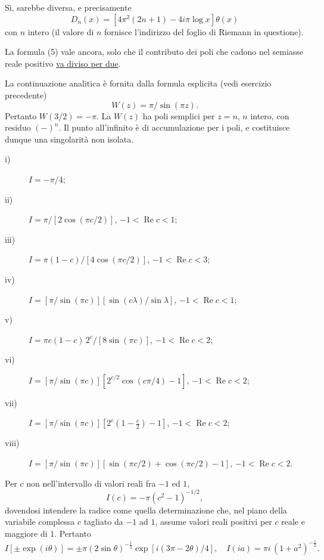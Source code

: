\documentclass[11pt, a4paper]{book}
\numberwithin{equation}{section}
\begin{document}
\begin{description}
Sì, sarebbe diversa, e precisamente
$$D_n(x) = \left[4\pi^2(2n+1) - 4i\pi\log x\right]\theta(x)$$
con $n$ intero (il valore di $n$ fornisce l'indirizzo del foglio di Riemann in questione).

\item[10-1] La formula (5) vale ancora, solo che il contributo dei poli che cadono nel semiasse reale positivo \uline{va diviso per due}.

\item[10-3] La continuazione analitica è fornita dalla formula esplicita (vedi esercizio precedente)
$$W(z) = \pi/\sin(\pi z).$$
Pertanto $W(3/2) = -\pi$. La $W(z)$ ha poli semplici per $z = n$, $n$ intero, con residuo $(-)^n$. Il punto all'infinito è di accumulazione per i poli, e costituisce dunque una singolarità non isolata.

\item[10-5] 
\begin{description}
\item[i)] $I = -\pi/4$;
\item[ii)] $I = \pi/\left[2\cos(\pi c/2)\right]$, \quad $-1 < \operatorname{Re} c < 1$;
\item[iii)] $I = \pi(1-c)/\left[4\cos(\pi c/2)\right]$, \quad $-1 < \operatorname{Re} c < 3$;
\item[iv)] $I = \left[\pi/\sin(\pi c)\right]\left[\sin(c\lambda)/\sin\lambda\right]$, \quad $-1 < \operatorname{Re} c < 1$;
\item[v)] $I = \pi c(1-c)\,2^c/\left[8\sin(\pi c)\right]$, \quad $-1 < \operatorname{Re} c < 2$;
\item[vi)] $I = \left[\pi/\sin(\pi c)\right]\left[2^{c/2}\cos(c\pi/4) - 1\right]$, \quad $-1 < \operatorname{Re} c < 2$;
\item[vii)] $I = \left[\pi/\sin(\pi c)\right]\left[2^c\left(1 - \tfrac{c}{2}\right) - 1\right]$, \quad $-1 < \operatorname{Re} c < 2$;
\item[viii)] $I = \left[\pi/\sin(\pi c)\right]\left[\sin(\pi c/2) + \cos(\pi c/2) - 1\right]$, \quad $-1 < \operatorname{Re} c < 2$.
\end{description}

\item[10-6] Per $c$ non nell'intervallo di valori reali fra $-1$ ed $1$,
$$I(c) = -\pi(c^2-1)^{-1/2},$$
dovendosi intendere la radice come quella determinazione che, nel piano della variabile complessa $c$ tagliato da $-1$ ad $1$, assume valori reali positivi per $c$ reale e maggiore di $1$. Pertanto
$$I\left[\pm\exp(i\theta)\right] = \pm\pi(2\sin\theta)^{-\frac{1}{2}}\exp\left[i(3\pi-2\theta)/4\right], \quad I(ia) = \pi i\,(1+a^2)^{-\frac{1}{2}}.$$


\end{description}
\end{document}

